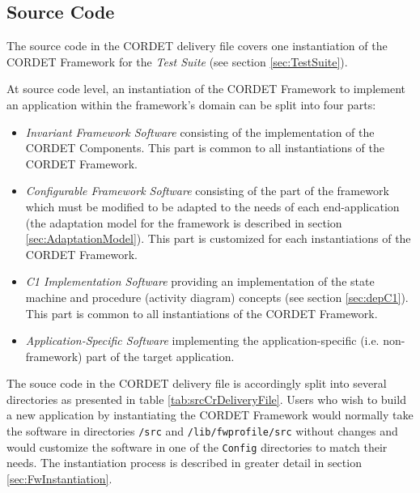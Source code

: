 \documentclass{pnp_article}
\begin{document}
\subsection{Source Code}\label{sec:fwSrcCode}

The source code in the CORDET delivery file covers one instantiation of the CORDET Framework for the \textit{Test Suite} (see section \ref{sec:TestSuite}). 

At source code level, an instantiation of the CORDET Framework to implement an application within the framework's domain can be split into four parts:

\begin{itemize}
\item \textit{Invariant Framework Software} consisting of the implementation of the CORDET Components. This part is common to all instantiations of the CORDET Framework. 
\item \textit{Configurable Framework Software} consisting of the part of the framework which must be modified to be adapted to the needs of each end-application (the adaptation model for the framework is described in section \ref{sec:AdaptationModel}). This part is customized for each instantiations of the CORDET Framework. 
\item \textit{C1 Implementation Software} providing an implementation of the state machine and procedure (activity diagram) concepts (see section \ref{sec:depC1}). This part is common to all instantiations of the CORDET Framework.
\item \textit{Application-Specific Software} implementing the application-specific (i.e. non-framework) part of the target application. 
\end{itemize}

The souce code in the CORDET delivery file is accordingly split into several directories as presented in table \ref{tab:srcCrDeliveryFile}. Users who wish to build a new application by instantiating the CORDET Framework would normally take the software in directories \texttt{/src} and \texttt{/lib/fwprofile/src} without changes and would customize the software in one of the \texttt{Config} directories to match their needs. The instantiation process is described in greater detail in section \ref{sec:FwInstantiation}.
\end{document}
